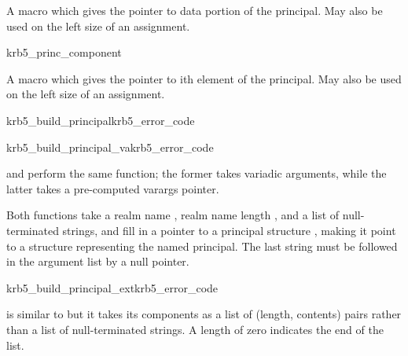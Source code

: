 \internalfunc

A macro which gives the pointer to data portion of the principal.
May also be used on the left size of an assignment.


\begin{funcdecl}{krb5_princ_component}{}
\end{funcdecl}

\internalfunc

A macro which gives the pointer to ith element of the principal.
May also be used on the left size of an assignment.

\begin{funcdecl}{krb5_build_principal}{krb5_error_code}{\funcinout}
\funcout
{}
\funcin
{}
\end{funcdecl}
\begin{funcdecl}{krb5_build_principal_va}{krb5_error_code}{\funcinout}
\funcout
{}
\funcin
{}
\end{funcdecl}

\begin{sloppypar}
 and
perform the same function; the former takes variadic arguments, while
the latter takes a pre-computed varargs pointer.
\end{sloppypar}

Both functions take a realm name , realm name length
, and a list of null-terminated strings, and fill in a
pointer to a principal structure , making it point to a
structure representing the named principal.
The last string must be followed in the argument list by a null pointer.


\begin{funcdecl}{krb5_build_principal_ext}{krb5_error_code}{\funcinout}
\funcout
{}
\funcin
{}
\end{funcdecl}

 is similar to
 but it takes its components as a list of
(length, contents) pairs rather than a list of null-terminated strings.
A length of zero indicates the end of the list.

